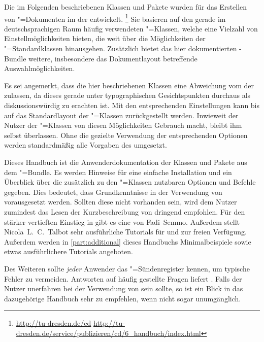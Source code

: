 \addchap{\prefacename}
Die im Folgenden beschriebenen Klassen und Pakete wurden für das Erstellen von 
"=Dokumenten im \CD der \TnUD entwickelt.%
\footnote{%
  \url{http://tu-dresden.de/cd}\hfill
  \url{http://tu-dresden.de/service/publizieren/cd/6_handbuch/index.html}%
}
Sie basieren auf den gerade im deutschsprachigen Raum häufig verwendeten 
\KOMAScript"=Klassen, welche eine Vielzahl von Einstellmöglichkeiten bieten, 
die weit über die Möglichkeiten der "=Standardklassen 
hinausgehen. Zusätzlich bietet das hier dokumentierten \TUDScript-Bundle 
weitere, insbesondere das Dokumentlayout betreffende Auswahlmöglichkeiten.

Es sei angemerkt, dass die hier beschriebenen Klassen eine Abweichung vom \CD 
der \TnUD zulassen, da dieses gerade unter typographischen Gesichtspunkten 
durchaus als diskussionswürdig zu erachten ist. Mit den entsprechenden 
Einstellungen kann bis auf das Standardlayout der \KOMAScript"=Klassen 
zurückgestellt werden. Inwieweit der Nutzer der \TUDScript"=Klassen von diesen 
Möglichkeiten Gebrauch macht, bleibt ihm selbst überlassen. Ohne die gezielte 
Verwendung der entsprechenden Optionen werden standardmäßig alle Vorgaben des 
\CDs umgesetzt.

Dieses Handbuch ist die Anwenderdokumentation der Klassen und Pakete aus dem 
\TUDScript"=Bundle. Es werden Hinweise für eine einfache Installation und ein 
Überblick über die zusätzlich zu den \KOMAScript"=Klassen nutzbaren Optionen 
und Befehle gegeben. Dies bedeutet, dass Grundkenntnisse in der Verwendung von 
 vorausgesetzt werden. Sollten diese nicht vorhanden sein, wird 
dem Nutzer zumindest das Lesen der Kurzbeschreibung von 
dringend empfohlen. Für den stärker vertieften Einstieg in  gibt 
es eine  von 
Fadi~Semmo. Außerdem stellt Nicola~L.~C.~Talbot sehr ausführliche Tutorials für 
 und 
 zur freien 
Verfügung. Außerdem werden in \autoref{part:additional} dieses Handbuchs 
Minimalbeispiele sowie etwas ausführlichere Tutorials angeboten.

Des Weiteren sollte \emph{jeder} Anwender das "=Sündenregister 
kennen, um typische Fehler zu vermeiden. Antworten auf häufig gestellte Fragen 
liefert . Falls der 
Nutzer unerfahren bei der Verwendung von \KOMAScript{} sein sollte, so ist ein 
Blick in das dazugehörige Handbuch \scrguide sehr zu empfehlen, wenn nicht 
sogar unumgänglich.


